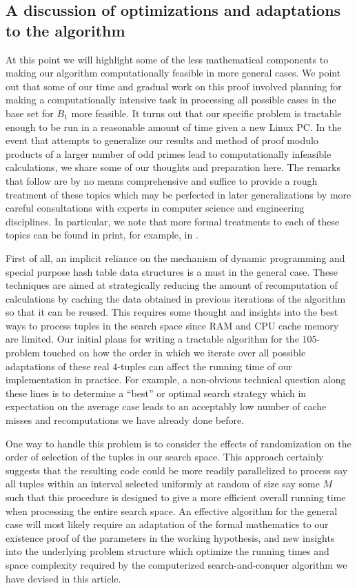 \documentclass[12pt]{article}
\begin{document}
\subsection{A discussion of optimizations and adaptations to the algorithm} 

At this point we will highlight some of the less mathematical components to making our algorithm 
computationally feasible in more general cases. We point out that some of our time and gradual 
work on this proof involved planning for making a computationally intensive task in processing all 
possible cases in the base set for $B_1$ more feasible. It turns out that our specific problem is 
tractable enough to be run in a reasonable amount of time given a new Linux PC. 
In the event that attempts to generalize our results and method of proof modulo products of a larger 
number of odd primes lead to computationally infeasible calculations, we share some of our thoughts and 
preparation here. The remarks that follow are by no means comprehensive and suffice to 
provide a rough treatment of these topics which may be perfected in later generalizations by 
more careful consultations with experts in computer science and engineering disciplines. 
In particular, we note that more formal treatments to each of these topics can be found in print, 
for example, in \cite{PARALLEL-COMPREF,TANENBAUM-OS}. 

First of all, an implicit reliance on the mechanism of dynamic programming and special purpose 
hash table data structures is a must in the general case. These techniques are aimed at strategically 
reducing the amount of recomputation of calculations by caching the data obtained in previous 
iterations of the algorithm so that it can be reused. This requires some thought and insights into the 
best ways to process tuples in the search space since RAM and CPU cache memory are limited. 
Our initial plans for writing a tractable algorithm for the $105$-problem 
touched on how the order in which we 
iterate over all possible adaptations of these real $4$-tuples can affect the running time of our 
implementation in practice. For example, a non-obvious technical question along these lines is to 
determine a ``best'' or optimal search strategy which in expectation on the average case leads to an 
acceptably low number of cache misses and recomputations we have already done before. 

One way to handle this problem is to consider the effects of randomization on the order of selection of the 
tuples in our search space. This approach certainly suggests that the resulting code could be more 
readily parallelized to process say all tuples within an interval selected uniformly at random of 
size say some $M$ such that this procedure is designed to give a more efficient overall running time 
when processing the entire search space. An effective algorithm for the general case will most likely 
require an adaptation of the formal mathematics to our existence proof of the parameters in the 
working hypothesis, and new insights into the underlying problem structure which optimize the 
running times and space complexity required by the computerized search-and-conquer algorithm we have 
devised in this article. 
\end{document}
